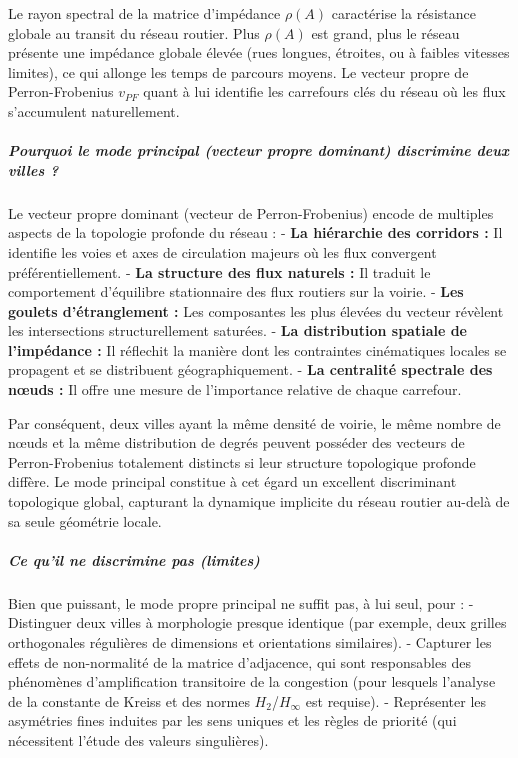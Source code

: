 \documentclass[10pt, a4paper]{article}
\begin{document}
Le rayon spectral de la matrice d'impédance \(\rho(A)\) caractérise la
résistance globale au transit du réseau routier. Plus \(\rho(A)\) est
grand, plus le réseau présente une impédance globale élevée (rues
longues, étroites, ou à faibles vitesses limites), ce qui allonge les
temps de parcours moyens. Le vecteur propre de Perron-Frobenius
\(v_{PF}\) quant à lui identifie les carrefours clés du réseau où les
flux s'accumulent naturellement.

\subparagraph{Pourquoi le mode principal (vecteur propre dominant)
discrimine deux villes
?}\label{pourquoi-le-mode-principal-vecteur-propre-dominant-discrimine-deux-villes}

Le vecteur propre dominant (vecteur de Perron-Frobenius) encode de
multiples aspects de la topologie profonde du réseau : - \textbf{La
hiérarchie des corridors :} Il identifie les voies et axes de
circulation majeurs où les flux convergent préférentiellement. -
\textbf{La structure des flux naturels :} Il traduit le comportement
d'équilibre stationnaire des flux routiers sur la voirie. - \textbf{Les
goulets d'étranglement :} Les composantes les plus élevées du vecteur
révèlent les intersections structurellement saturées. - \textbf{La
distribution spatiale de l'impédance :} Il réflechit la manière dont les
contraintes cinématiques locales se propagent et se distribuent
géographiquement. - \textbf{La centralité spectrale des nœuds :} Il
offre une mesure de l'importance relative de chaque carrefour.

Par conséquent, deux villes ayant la même densité de voirie, le même
nombre de nœuds et la même distribution de degrés peuvent posséder des
vecteurs de Perron-Frobenius totalement distincts si leur structure
topologique profonde diffère. Le mode principal constitue à cet égard un
excellent discriminant topologique global, capturant la dynamique
implicite du réseau routier au-delà de sa seule géométrie locale.

\subparagraph{Ce qu'il ne discrimine pas
(limites)}\label{ce-quil-ne-discrimine-pas-limites}

Bien que puissant, le mode propre principal ne suffit pas, à lui seul,
pour : - Distinguer deux villes à morphologie presque identique (par
exemple, deux grilles orthogonales régulières de dimensions et
orientations similaires). - Capturer les effets de non-normalité de la
matrice d'adjacence, qui sont responsables des phénomènes
d'amplification transitoire de la congestion (pour lesquels l'analyse de
la constante de Kreiss et des normes \(H_2\)/\(H_\infty\) est requise).
- Représenter les asymétries fines induites par les sens uniques et les
règles de priorité (qui nécessitent l'étude des valeurs singulières).
\end{document}
